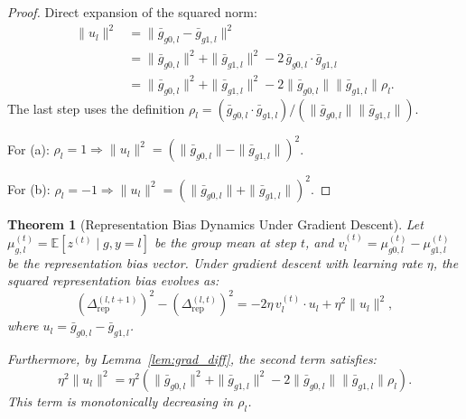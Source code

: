 \documentclass[11pt]{article}
\newtheorem{theorem}{Theorem}
\begin{document}
\begin{proof}
    Direct expansion of the squared norm:
    \begin{align}
        \|u_l\|^2 &= \|\bar{g}_{g0,l} - \bar{g}_{g1,l}\|^2 \\
        &= \|\bar{g}_{g0,l}\|^2 + \|\bar{g}_{g1,l}\|^2 - 2\,\bar{g}_{g0,l} \cdot \bar{g}_{g1,l} \\
        &= \|\bar{g}_{g0,l}\|^2 + \|\bar{g}_{g1,l}\|^2 - 2\|\bar{g}_{g0,l}\|\|\bar{g}_{g1,l}\|\rho_l.
    \end{align}
    The last step uses the definition $\rho_l = (\bar{g}_{g0,l} \cdot \bar{g}_{g1,l})/(\|\bar{g}_{g0,l}\|\|\bar{g}_{g1,l}\|)$.

    For (a): $\rho_l = 1 \Rightarrow \|u_l\|^2 = (\|\bar{g}_{g0,l}\| - \|\bar{g}_{g1,l}\|)^2$.

    For (b): $\rho_l = -1 \Rightarrow \|u_l\|^2 = (\|\bar{g}_{g0,l}\| + \|\bar{g}_{g1,l}\|)^2$.
\end{proof}

\begin{theorem}[Representation Bias Dynamics Under Gradient Descent]
    \label{thm:rep_dynamics}
    Let $\mu_{g,l}^{(t)} = \mathbb{E}[z^{(t)} \mid g, y=l]$ be the group mean at step $t$, and $v_l^{(t)} = \mu_{g0,l}^{(t)} - \mu_{g1,l}^{(t)}$ be the representation bias vector. Under gradient descent with learning rate $\eta$, the squared representation bias evolves as:
    \begin{equation}
        \left(\Delta_{\mathrm{rep}}^{(l,t+1)}\right)^2 - \left(\Delta_{\mathrm{rep}}^{(l,t)}\right)^2 = -2\eta\, v_l^{(t)} \cdot u_l + \eta^2 \|u_l\|^2,
    \end{equation}
    where $u_l = \bar{g}_{g0,l} - \bar{g}_{g1,l}$.

    Furthermore, by Lemma~\ref{lem:grad_diff}, the second term satisfies:
    \begin{equation}
        \eta^2 \|u_l\|^2 = \eta^2\!\left(\|\bar{g}_{g0,l}\|^2 + \|\bar{g}_{g1,l}\|^2 - 2\|\bar{g}_{g0,l}\|\|\bar{g}_{g1,l}\|\rho_l\right).
    \end{equation}
    This term is monotonically decreasing in $\rho_l$.
\end{theorem}
\end{document}
